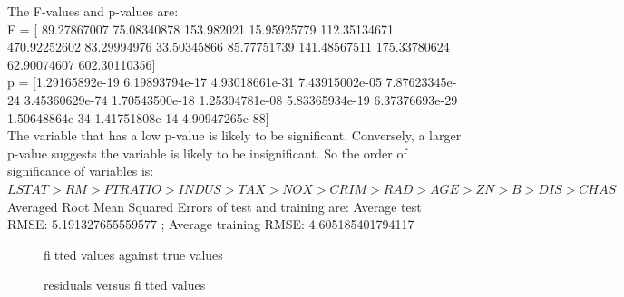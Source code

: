 \documentclass{article}
\begin{document}
\bigbreak 
The F-values and p-values are:\\

F = [ 89.27867007  75.08340878 153.982021    15.95925779 112.35134671 470.92252602  83.29994976 33.50345866  85.77751739 141.48567511 175.33780624  62.90074607 602.30110356]\\

p = [1.29165892e-19 6.19893794e-17 4.93018661e-31 7.43915002e-05 7.87623345e-24 3.45360629e-74 1.70543500e-18 1.25304781e-08 5.83365934e-19 6.37376693e-29 1.50648864e-34 1.41751808e-14 4.90947265e-88]\\

The variable that has a low p-value is likely to be significant. Conversely, a larger p-value suggests the variable is likely to be insignificant. So the order of significance of variables is: $LSTAT>RM>PTRATIO>INDUS>TAX>NOX>CRIM>RAD>AGE>ZN>B>DIS>CHAS$\\

Averaged Root Mean Squared Errors of test and training are: 
Average test RMSE: 5.191327655559577 ; Average training RMSE: 4.605185401794117

\begin{figure}[!htbp]
\centering
{}
\caption{fitted values against true values} \label{dataset2_1}
\end{figure}

\begin{figure}[!htbp]
\centering
{}
\caption{residuals versus fitted values} \label{dataset2_2}
\end{figure}
\end{document}

